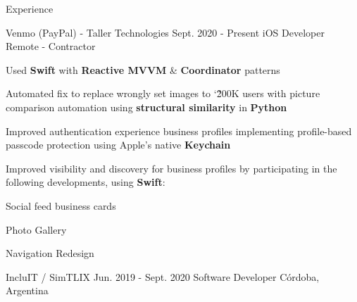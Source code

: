\documentclass{curriculum}
\begin{document}

\begin{cvsection}{Experience}


    \makesectionitemheader
        {Venmo (PayPal) - Taller Technologies}              {Sept. 2020 - Present}
        {iOS Developer}                                      {Remote - Contractor}

        \begin{sectionitemlist}

        \item{
            Used \textbf{Swift} with \textbf{Reactive MVVM} \& \textbf{Coordinator} patterns
        }
        \item{
            Automated fix to replace wrongly set images to \char`\~ 200K users with
            picture comparison automation using \textbf{structural similarity} in \textbf{Python}
        }
        \item{
            Improved authentication experience business profiles implementing
            profile-based passcode protection using Apple's native \textbf{Keychain}
        }
        \item{
            Improved visibility and discovery for business profiles by participating
            in the following developments, using \textbf{Swift}:
        }
        {
            \begin{colsectionitemlist}{3}
            \item{Social feed business cards}
            \item{Photo Gallery}
            \item{Navigation Redesign}
            \end{colsectionitemlist}
        }

        \end{sectionitemlist}


    \makesectionitemheader
        {IncluIT / SimTLIX}                             {Jun. 2019 - Sept. 2020}
        {Software Developer}                                {Córdoba, Argentina}


\end{cvsection}
\end{document}

